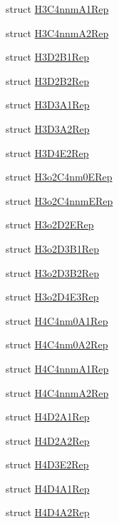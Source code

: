 \begin{DoxyCompactItemize}
struct \mbox{\hyperlink{structHadron_1_1H3C4nnmA1Rep}{H3\+C4nnm\+A1\+Rep}}
\item 
struct \mbox{\hyperlink{structHadron_1_1H3C4nnmA2Rep}{H3\+C4nnm\+A2\+Rep}}
\item 
struct \mbox{\hyperlink{structHadron_1_1H3D2B1Rep}{H3\+D2\+B1\+Rep}}
\item 
struct \mbox{\hyperlink{structHadron_1_1H3D2B2Rep}{H3\+D2\+B2\+Rep}}
\item 
struct \mbox{\hyperlink{structHadron_1_1H3D3A1Rep}{H3\+D3\+A1\+Rep}}
\item 
struct \mbox{\hyperlink{structHadron_1_1H3D3A2Rep}{H3\+D3\+A2\+Rep}}
\item 
struct \mbox{\hyperlink{structHadron_1_1H3D4E2Rep}{H3\+D4\+E2\+Rep}}
\item 
struct \mbox{\hyperlink{structHadron_1_1H3o2C4nm0ERep}{H3o2\+C4nm0\+E\+Rep}}
\item 
struct \mbox{\hyperlink{structHadron_1_1H3o2C4nnmERep}{H3o2\+C4nnm\+E\+Rep}}
\item 
struct \mbox{\hyperlink{structHadron_1_1H3o2D2ERep}{H3o2\+D2\+E\+Rep}}
\item 
struct \mbox{\hyperlink{structHadron_1_1H3o2D3B1Rep}{H3o2\+D3\+B1\+Rep}}
\item 
struct \mbox{\hyperlink{structHadron_1_1H3o2D3B2Rep}{H3o2\+D3\+B2\+Rep}}
\item 
struct \mbox{\hyperlink{structHadron_1_1H3o2D4E3Rep}{H3o2\+D4\+E3\+Rep}}
\item 
struct \mbox{\hyperlink{structHadron_1_1H4C4nm0A1Rep}{H4\+C4nm0\+A1\+Rep}}
\item 
struct \mbox{\hyperlink{structHadron_1_1H4C4nm0A2Rep}{H4\+C4nm0\+A2\+Rep}}
\item 
struct \mbox{\hyperlink{structHadron_1_1H4C4nnmA1Rep}{H4\+C4nnm\+A1\+Rep}}
\item 
struct \mbox{\hyperlink{structHadron_1_1H4C4nnmA2Rep}{H4\+C4nnm\+A2\+Rep}}
\item 
struct \mbox{\hyperlink{structHadron_1_1H4D2A1Rep}{H4\+D2\+A1\+Rep}}
\item 
struct \mbox{\hyperlink{structHadron_1_1H4D2A2Rep}{H4\+D2\+A2\+Rep}}
\item 
struct \mbox{\hyperlink{structHadron_1_1H4D3E2Rep}{H4\+D3\+E2\+Rep}}
\item 
struct \mbox{\hyperlink{structHadron_1_1H4D4A1Rep}{H4\+D4\+A1\+Rep}}
\item 
struct \mbox{\hyperlink{structHadron_1_1H4D4A2Rep}{H4\+D4\+A2\+Rep}}
\item 

\end{DoxyCompactItemize}
